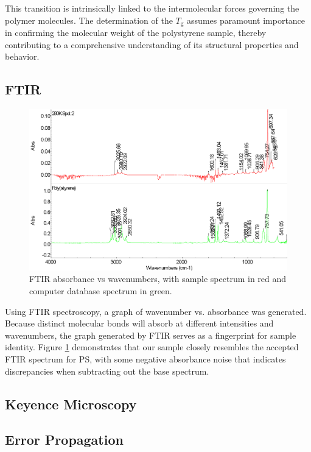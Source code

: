 \documentclass[twocolumn]{article}
\begin{document}
                This transition is intrinsically linked to the intermolecular forces governing the polymer molecules\autocite{WOS:COUCHMAN}. The determination of the $T_\text{g}$ assumes paramount importance in confirming the molecular weight of the polystyrene sample, thereby contributing to a comprehensive understanding of its structural properties and behavior.

            \subsection{FTIR}
                \begin{figure}
                    \centering
                    \includegraphics[width=\columnwidth]{img/ftir-comp.png}
                    \caption{FTIR absorbance vs wavenumbers, with sample spectrum in red and computer database spectrum in green.}\label{fig:ftir-comp}
                \end{figure}
                Using FTIR spectroscopy, a graph of wavenumber vs. absorbance  was generated. Because distinct  molecular bonds will absorb at different intensities and wavenumbers, the graph generated by FTIR serves as a fingerprint for sample identity. Figure \ref{fig:ftir-comp} demonstrates that our sample closely resembles the accepted FTIR spectrum for PS, with some negative absorbance noise that indicates discrepancies when subtracting out the base spectrum.
            
            \subsection{Keyence Microscopy}

            \subsection{Error Propagation}
\end{document}
